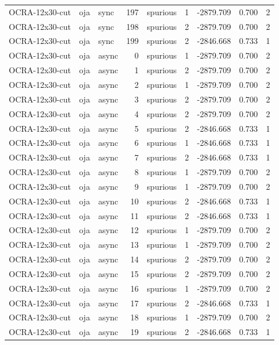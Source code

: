 \begin{tabular}{lllrlrrrr}
OCRA-12x30-cut & oja & sync & 197 & spurious & 1 & -2879.709 & 0.700 & 2 \\
OCRA-12x30-cut & oja & sync & 198 & spurious & 2 & -2879.709 & 0.700 & 2 \\
OCRA-12x30-cut & oja & sync & 199 & spurious & 2 & -2846.668 & 0.733 & 1 \\
OCRA-12x30-cut & oja & async & 0 & spurious & 1 & -2879.709 & 0.700 & 2 \\
OCRA-12x30-cut & oja & async & 1 & spurious & 2 & -2879.709 & 0.700 & 2 \\
OCRA-12x30-cut & oja & async & 2 & spurious & 1 & -2879.709 & 0.700 & 2 \\
OCRA-12x30-cut & oja & async & 3 & spurious & 2 & -2879.709 & 0.700 & 2 \\
OCRA-12x30-cut & oja & async & 4 & spurious & 2 & -2879.709 & 0.700 & 2 \\
OCRA-12x30-cut & oja & async & 5 & spurious & 2 & -2846.668 & 0.733 & 1 \\
OCRA-12x30-cut & oja & async & 6 & spurious & 1 & -2846.668 & 0.733 & 1 \\
OCRA-12x30-cut & oja & async & 7 & spurious & 2 & -2846.668 & 0.733 & 1 \\
OCRA-12x30-cut & oja & async & 8 & spurious & 1 & -2879.709 & 0.700 & 2 \\
OCRA-12x30-cut & oja & async & 9 & spurious & 1 & -2879.709 & 0.700 & 2 \\
OCRA-12x30-cut & oja & async & 10 & spurious & 2 & -2846.668 & 0.733 & 1 \\
OCRA-12x30-cut & oja & async & 11 & spurious & 2 & -2846.668 & 0.733 & 1 \\
OCRA-12x30-cut & oja & async & 12 & spurious & 1 & -2879.709 & 0.700 & 2 \\
OCRA-12x30-cut & oja & async & 13 & spurious & 1 & -2879.709 & 0.700 & 2 \\
OCRA-12x30-cut & oja & async & 14 & spurious & 2 & -2879.709 & 0.700 & 2 \\
OCRA-12x30-cut & oja & async & 15 & spurious & 2 & -2879.709 & 0.700 & 2 \\
OCRA-12x30-cut & oja & async & 16 & spurious & 1 & -2879.709 & 0.700 & 2 \\
OCRA-12x30-cut & oja & async & 17 & spurious & 2 & -2846.668 & 0.733 & 1 \\
OCRA-12x30-cut & oja & async & 18 & spurious & 1 & -2879.709 & 0.700 & 2 \\
OCRA-12x30-cut & oja & async & 19 & spurious & 2 & -2846.668 & 0.733 & 1 \\

\end{tabular}

